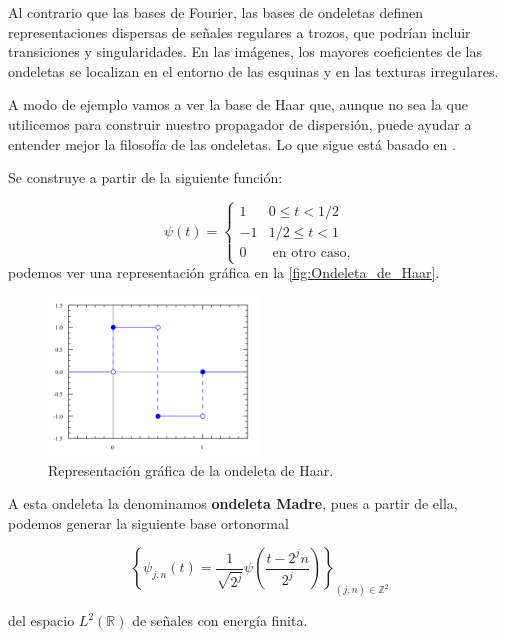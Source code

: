 \medskip

\noindent Al contrario que las bases de Fourier, las bases de ondeletas definen  representaciones dispersas de señales regulares a trozos, que podrían incluir transiciones y singularidades. En las imágenes, los mayores coeficientes de las ondeletas se localizan en el entorno de las esquinas y en las texturas irregulares.

\medskip

\noindent A modo de ejemplo vamos a ver la base de Haar que, aunque no sea la que utilicemos para construir nuestro propagador de dispersión, puede ayudar a entender mejor la filosofía de las ondeletas. Lo que sigue está basado en  \cite{MallatWavelets}.

\medskip

\noindent Se construye a partir de la siguiente función: 

$$ \psi(t)= \begin{cases} 
      1 & 0\leq t < 1/2 \\
      -1 & 1/2\leq t < 1 \\
      0 & \; \text{en otro caso},
   \end{cases}$$
\noindent podemos ver una representación gráfica en la \autoref{fig:Ondeleta_de_Haar}.
\begin{figure}[!h]
  \centering
  \includegraphics[width=0.5\textwidth]{img/Haar_wavelet.png}
  \caption{Representación gráfica de la ondeleta de Haar.}
  \label{fig:Ondeleta_de_Haar}
\end{figure}

\noindent A esta ondeleta la denominamos \textbf{ondeleta Madre}, pues a partir de ella, podemos generar la siguiente base ortonormal

\medskip

$$\left \lbrace \psi_{j,n}(t)= \frac{1}{\sqrt{2^j}} \psi\left(\frac{t-2^jn}{2^j}\right) \right\rbrace_{(j,n) \in \mathbb{Z}^2}$$

\noindent del espacio $L^2(\mathbb{R})$ de señales con energía finita.

